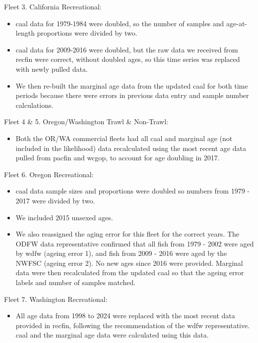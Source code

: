 \documentclass[
]{scrartcl}
\providecommand{\tightlist}{%
  \setlength{\itemsep}{0pt}\setlength{\parskip}{0pt}}\usepackage{longtable,booktabs,array}
\begin{document}
Fleet 3. California Recreational:

\begin{itemize}
\tightlist
\item
  \gls{caal} data for 1979-1984 were doubled, so the number of samples
  and age-at-length proportions were divided by two.
\item
  \gls{caal} data for 2009-2016 were doubled, but the raw data we
  received from \gls{recfin} were correct, without doubled ages, so this
  time series was replaced with newly pulled data.
\item
  We then re-built the marginal age data from the updated \gls{caal} for
  both time periods because there were errors in previous data entry and
  sample number calculations.
\end{itemize}

Fleet 4 \& 5. Oregon/Washington Trawl \& Non-Trawl:

\begin{itemize}
\tightlist
\item
  Both the OR/WA commercial fleets had all \gls{caal} and marginal age
  (not included in the likelihood) data recalculated using the most
  recent age data pulled from \gls{pacfin} and \gls{wcgop}, to account
  for age doubling in 2017.
\end{itemize}

Fleet 6. Oregon Recreational:

\begin{itemize}
\tightlist
\item
  \gls{caal} data sample sizes and proportions were doubled so numbers
  from 1979 - 2017 were divided by two.
\item
  We included 2015 unsexed ages.
\item
  We also reassigned the aging error for this fleet for the correct
  years. The ODFW data representative confirmed that all fish from 1979
  - 2002 were aged by \gls{wdfw} (ageing error 1), and fish from 2009 -
  2016 were aged by the NWFSC (ageing error 2). No new ages since 2016
  were provided. Marginal data were then recalculated from the updated
  \gls{caal} so that the ageing error labels and number of samples
  matched.
\end{itemize}

Fleet 7. Washington Recreational:

\begin{itemize}
\tightlist
\item
  All age data from 1998 to 2024 were replaced with the most recent data
  provided in \gls{recfin}, following the recommendation of the
  \gls{wdfw} representative. \gls{caal} and the marginal age data were
  calculated using this data.
\end{itemize}
\end{document}
